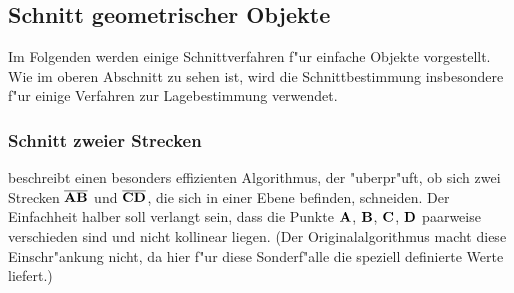 %
%

\subsection{Schnitt geometrischer Objekte}
Im Folgenden werden einige Schnittverfahren f"ur einfache Objekte vorgestellt. 
Wie im oberen Abschnitt zu sehen ist, wird die Schnittbestimmung insbesondere 
f"ur einige Verfahren zur Lagebestimmung verwendet.

\subsubsection{Schnitt zweier Strecken}
\cite{algo_cpp} beschreibt einen besonders effizienten Algorithmus, der  
"uberpr"uft, ob sich zwei Strecken $\overline{{\bf A}{\bf B}}$ und 
$\overline{{\bf C}{\bf D}}$, die sich in einer Ebene befinden, schneiden. 
Der Einfachheit halber soll verlangt sein, dass die Punkte 
${\bf A}$, ${\bf B}$, ${\bf C}$, ${\bf D}$ paarweise verschieden 
sind und nicht kollinear liegen. 
(Der Originalalgorithmus macht diese Einschr"ankung nicht, da hier f"ur diese 
Sonderf"alle die  speziell 
definierte Werte liefert.)

